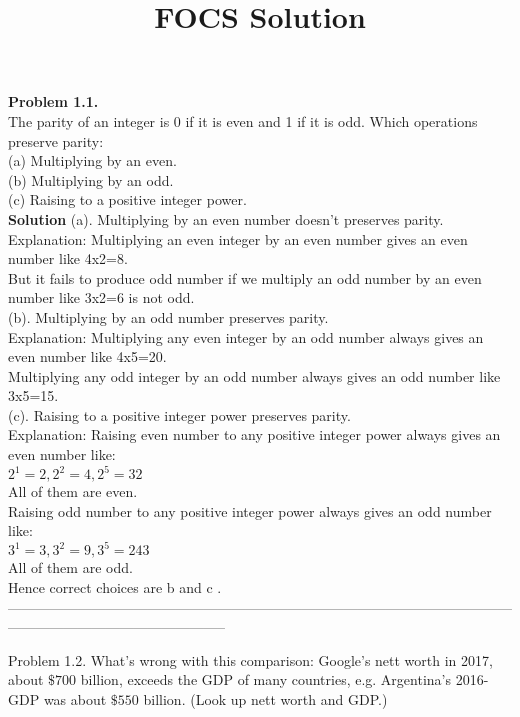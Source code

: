 \documentclass[10pt]{article}
\title{FOCS Solution}
\author{}
\date{}
\begin{document}
\maketitle
\textbf{Problem 1.1.} \\[0.05in]
The parity of an integer is 0 if it is even and 1 if it is odd. Which operations preserve parity:\\[0.05in]
(a) Multiplying by an even.\\[0.05in]
(b) Multiplying by an odd.\\[0.05in]
(c) Raising to a positive integer power.\\[0.05in]
\textbf{Solution} 
(a). Multiplying by an even number doesn't preserves parity.\\[0.05in]
Explanation: Multiplying an even integer by an even number gives an even number like 4x2=8. \\[0.05in]
But it fails to produce odd number if we multiply an odd number by an even number like 3x2=6 is not odd.\\[0.05in]
(b). Multiplying by an odd number preserves parity. \\[0.05in]
Explanation: Multiplying any even integer by an odd number always gives an even number like 4x5=20.\\[0.05in]
Multiplying any odd integer by an odd number always gives an odd number like 3x5=15.\\[0.05in]
(c). Raising to a positive integer power preserves parity.\\[0.05in]
Explanation: Raising even number to any positive integer power always gives an even number like:\\[0.05in]
$2^1=2, 2^2=4, 2^5=32$\\[0.05in]
All of them are even.\\[0.05in]
Raising odd number to any positive integer power always gives an odd number like:\\[0.05in]
$3^1=3, 3^2=9, 3^5=243$\\[0.05in]
All of them are odd.\\[0.05in]
Hence correct choices are b and c .\\[0.05in]
-----------------------------------------------------------------------------------------------------------------------------------------------------------


Problem 1.2. What's wrong with this comparison: Google's nett worth in 2017, about $\$ 700$ billion, exceeds the GDP of many countries, e.g. Argentina's 2016-GDP was about $\$ 550$ billion. (Look up nett worth and GDP.)
\end{document}
